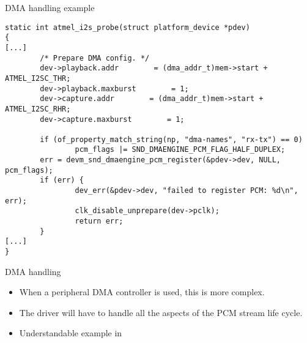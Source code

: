\begin{frame}[fragile]{DMA handling example}
  \begin{block}{}
    \fontsize{8}{8}\selectfont
    \begin{verbatim}
static int atmel_i2s_probe(struct platform_device *pdev)
{
[...]
        /* Prepare DMA config. */
        dev->playback.addr        = (dma_addr_t)mem->start + ATMEL_I2SC_THR;
        dev->playback.maxburst        = 1;
        dev->capture.addr        = (dma_addr_t)mem->start + ATMEL_I2SC_RHR;
        dev->capture.maxburst        = 1;

        if (of_property_match_string(np, "dma-names", "rx-tx") == 0)
                pcm_flags |= SND_DMAENGINE_PCM_FLAG_HALF_DUPLEX;
        err = devm_snd_dmaengine_pcm_register(&pdev->dev, NULL, pcm_flags);
        if (err) {
                dev_err(&pdev->dev, "failed to register PCM: %d\n", err);
                clk_disable_unprepare(dev->pclk);
                return err;
        }
[...]
}
    \end{verbatim}
  \end{block}
\end{frame}

\begin{frame}{DMA handling}
  \begin{itemize}
  \item When a peripheral DMA controller is used, this is more
    complex.
  \item The driver will have to handle all the aspects of the PCM
    stream life cycle.
  \item Understandable example in 
  \end{itemize}
\end{frame}


